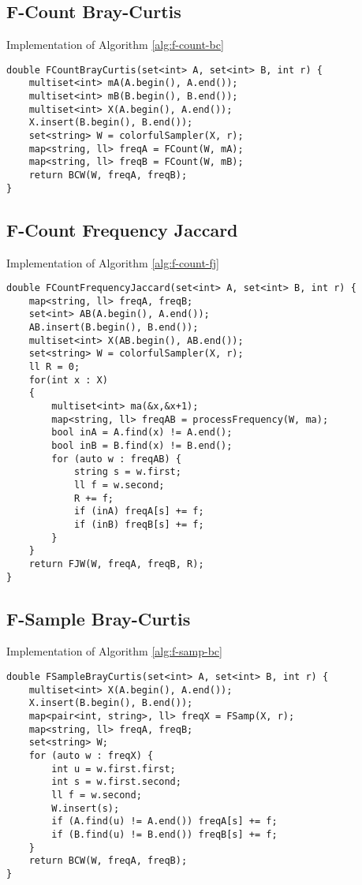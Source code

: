 \clearpage
\subsection*{F-Count Bray-Curtis}

Implementation of Algorithm \ref{alg:f-count-bc}
\begin{lstlisting}
double FCountBrayCurtis(set<int> A, set<int> B, int r) {
	multiset<int> mA(A.begin(), A.end());
	multiset<int> mB(B.begin(), B.end());
	multiset<int> X(A.begin(), A.end());
	X.insert(B.begin(), B.end());
	set<string> W = colorfulSampler(X, r);
	map<string, ll> freqA = FCount(W, mA);
	map<string, ll> freqB = FCount(W, mB);
	return BCW(W, freqA, freqB);
}
\end{lstlisting}

\subsection*{F-Count Frequency Jaccard}

Implementation of Algorithm \ref{alg:f-count-fj}
\begin{lstlisting}
double FCountFrequencyJaccard(set<int> A, set<int> B, int r) {
	map<string, ll> freqA, freqB;
	set<int> AB(A.begin(), A.end());
	AB.insert(B.begin(), B.end());
	multiset<int> X(AB.begin(), AB.end());
	set<string> W = colorfulSampler(X, r);
	ll R = 0;
	for(int x : X)
	{
		multiset<int> ma(&x,&x+1);
		map<string, ll> freqAB = processFrequency(W, ma);
		bool inA = A.find(x) != A.end();
		bool inB = B.find(x) != B.end();
		for (auto w : freqAB) {
			string s = w.first;
			ll f = w.second;
			R += f;
			if (inA) freqA[s] += f;
			if (inB) freqB[s] += f;
		}
	}
	return FJW(W, freqA, freqB, R);
}
\end{lstlisting}

\clearpage
\subsection*{F-Sample Bray-Curtis}

Implementation of Algorithm \ref{alg:f-samp-bc}
\begin{lstlisting}
double FSampleBrayCurtis(set<int> A, set<int> B, int r) {
	multiset<int> X(A.begin(), A.end());
	X.insert(B.begin(), B.end());
	map<pair<int, string>, ll> freqX = FSamp(X, r);
	map<string, ll> freqA, freqB;
	set<string> W;
	for (auto w : freqX) {
		int u = w.first.first;
		int s = w.first.second;
		ll f = w.second;
		W.insert(s);
		if (A.find(u) != A.end()) freqA[s] += f;
		if (B.find(u) != B.end()) freqB[s] += f;
	}
	return BCW(W, freqA, freqB);
}
\end{lstlisting}

